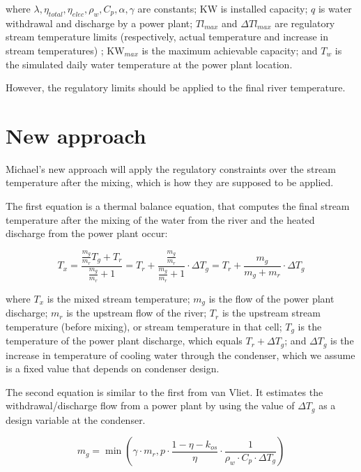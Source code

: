 \documentclass[11pt, oneside]{article}   	%
\begin{document}
where $\lambda, \eta_{total}, \eta_{elec}, \rho_w, C_p, \alpha, \gamma$ are constants; KW is installed capacity; $q$ is water withdrawal and discharge by a power plant; $Tl_{max}$ and $ \Delta Tl_{max}$ are regulatory stream temperature limits (respectively, actual temperature and increase in stream temperatures) ; $\text{KW}_{max}$ is the maximum achievable capacity; and $T_w$ is the simulated daily water temperature at the power plant location. 

However, the regulatory limits should be applied to the final river temperature.

\section{New approach}

Michael's new approach will apply the regulatory constraints over the stream temperature after the mixing, which is how they are supposed to be applied.

The first equation is a thermal balance equation, that computes the final stream temperature after the mixing of the water from the river and the heated discharge from the power plant occur:

\begin{equation}
T_x = \frac{\frac{m_g}{m_r}T_g + T_r}{\frac{m_g}{m_r} + 1} = T_r + \frac{\frac{m_g}{m_r}}{\frac{m_g}{m_r} + 1}\cdot \Delta T_g = T_r + \frac{m_g}{m_g + m_r}\cdot \Delta T_g
\end{equation}

where $T_x$ is the mixed stream temperature; $m_g$ is the flow of the power plant discharge; $m_r$ is the upstream flow of the river; $T_r$ is the upstream stream temperature (before mixing), or stream temperature in that cell; $T_g$ is the temperature of the power plant discharge, which equals $T_r + \Delta T_g$; and $\Delta T_g$ is the increase in temperature of cooling water through the condenser, which we assume is a fixed value that depends on condenser design. 

The second equation is similar to the first from van Vliet. It estimates the withdrawal/discharge flow from a power plant by using the value of $\Delta T_g$ as a design variable at the condenser.

\begin{equation}
m_g = \min{\left (\gamma \cdot m_r, p \cdot \frac{1-\eta - k_{os}}{\eta} \cdot \frac{1}{\rho_w \cdot C_p \cdot \Delta T_{g}}\right)}
\end{equation}
\end{document}
